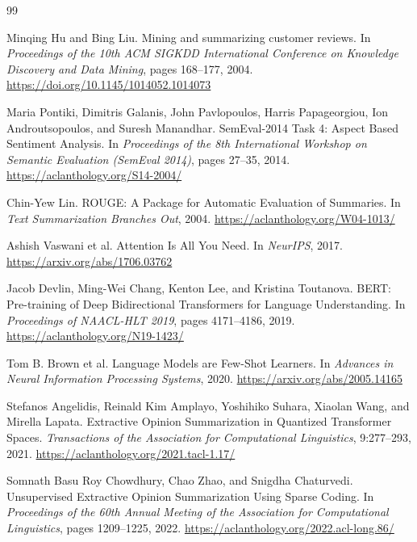 \documentclass[12pt,a4paper]{report}
\begin{document}
\begin{thebibliography}{99}

Minqing Hu and Bing Liu.
\newblock Mining and summarizing customer reviews.
\newblock In \textit{Proceedings of the 10th ACM SIGKDD International Conference on Knowledge Discovery and Data Mining}, pages 168--177, 2004.
\newblock \url{https://doi.org/10.1145/1014052.1014073}

Maria Pontiki, Dimitris Galanis, John Pavlopoulos, Harris Papageorgiou, Ion Androutsopoulos, and Suresh Manandhar.
\newblock SemEval-2014 Task 4: Aspect Based Sentiment Analysis.
\newblock In \textit{Proceedings of the 8th International Workshop on Semantic Evaluation (SemEval 2014)}, pages 27--35, 2014.
\newblock \url{https://aclanthology.org/S14-2004/}

Chin-Yew Lin.
\newblock ROUGE: A Package for Automatic Evaluation of Summaries.
\newblock In \textit{Text Summarization Branches Out}, 2004.
\newblock \url{https://aclanthology.org/W04-1013/}

Ashish Vaswani et al.
\newblock Attention Is All You Need.
\newblock In \textit{NeurIPS}, 2017.
\newblock \url{https://arxiv.org/abs/1706.03762}

Jacob Devlin, Ming-Wei Chang, Kenton Lee, and Kristina Toutanova.
\newblock BERT: Pre-training of Deep Bidirectional Transformers for Language Understanding.
\newblock In \textit{Proceedings of NAACL-HLT 2019}, pages 4171--4186, 2019.
\newblock \url{https://aclanthology.org/N19-1423/}

Tom B. Brown et al.
\newblock Language Models are Few-Shot Learners.
\newblock In \textit{Advances in Neural Information Processing Systems}, 2020.
\newblock \url{https://arxiv.org/abs/2005.14165}

Stefanos Angelidis, Reinald Kim Amplayo, Yoshihiko Suhara, Xiaolan Wang, and Mirella Lapata.
\newblock Extractive Opinion Summarization in Quantized Transformer Spaces.
\newblock \textit{Transactions of the Association for Computational Linguistics}, 9:277--293, 2021.
\newblock \url{https://aclanthology.org/2021.tacl-1.17/}

Somnath Basu Roy Chowdhury, Chao Zhao, and Snigdha Chaturvedi.
\newblock Unsupervised Extractive Opinion Summarization Using Sparse Coding.
\newblock In \textit{Proceedings of the 60th Annual Meeting of the Association for Computational Linguistics}, pages 1209--1225, 2022.
\newblock \url{https://aclanthology.org/2022.acl-long.86/}


\end{thebibliography}
\end{document}
